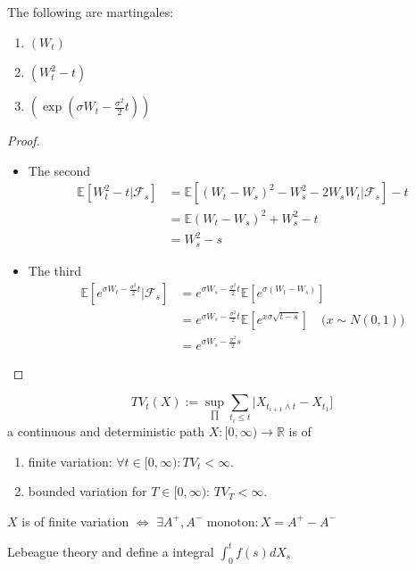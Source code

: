 \begin{theorem}
	 The following are martingales:
	 \begin{enumerate}
	 	\item $(W_t)$
	 	\item $(W_t^2 - t)$
	 	\item $\left(\exp(\sigma W_t - \frac{\sigma^2}{2}t)\right)$
	 \end{enumerate}
\end{theorem}
\begin{proof}\quad
	\begin{itemize}
		\item The second
		\begin{align*}
			\mathbb{E}[W_t^2 - t|\mathcal{F}_s] &= \mathbb{E}[(W_t - W_s)^2 - W_s^2 - 2W_sW_t|\mathcal{F}_s] - t\\
			&= \mathbb{E}(W_t-W_s)^2 + W_s^2 - t\\
			&= W_s^2 - s
		\end{align*}
		 
		\item The third
		\begin{align*}
			\mathbb{E}[e^{\sigma W_t - \frac{\sigma^2}{2}t} |\mathcal{F}_s] &= e^{\sigma W_s - \frac{\sigma^2}{2}t}\mathbb{E}[e^{\sigma(W_t - W_s)}]\\
			&= e^{\sigma W_s - \frac{\sigma^2}{2}t}\mathbb{E}[e^{x\sigma \sqrt{t-s}}] \quad \text{($x \sim N(0, 1)$)}\\
			&= e^{\sigma W_s - \frac{\sigma^2}{2}s}
		\end{align*}
	\end{itemize}
\end{proof}


\begin{definition}
	\begin{equation*}
		TV_t(X) := \sup_{\prod}\sum_{t_i \leq t}|X_{t_{i+1} \wedge t} - X_{t_1}]
	\end{equation*}
	a continuous and deterministic path $X: [0, \infty) \rightarrow \mathbb{R}$ is of 
	\begin{enumerate}
		\item  finite variation: $\forall t \in [0, \infty): TV_t < \infty$.
		\item bounded variation for $T \in [0, \infty)$: $TV_T < \infty$. 
	\end{enumerate}
\end{definition}

\begin{lemma}
	$X$ is of finite variation $\Leftrightarrow$ $\exists A^+, A^- \text{ monoton}: X = A^+ - A^-$
\end{lemma}
\begin{remark}
Lebeague theory and define a integral $\int_0^t f(s) dX_s $	
\end{remark}

